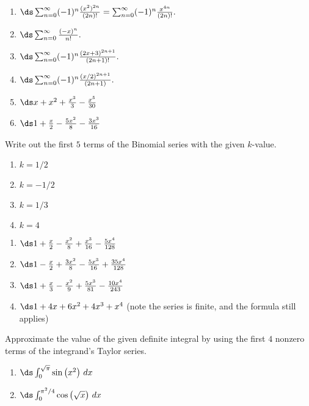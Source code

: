 \begin{enumialphparenastyle}
\begin{ex}
\begin{sol}
\begin{enumerate}
\item 
{$\ds \sum_{n=0}^\infty (-1)^n\frac{(x^2)^{2n}}{(2n)!} = \sum_{n=0}^\infty (-1)^n\frac{x^{4n}}{(2n)!}.$
}
\item 
{$\ds \sum_{n=0}^\infty \frac{(-x)^n}{n!}.$
}
\item 
{$\ds \sum_{n=0}^\infty (-1)^n\frac{(2x+3)^{2n+1}}{(2n+1)!}.$
}
\item 
{$\ds \sum_{n=0}^\infty (-1)^n\frac{(x/2)^{2n+1}}{(2n+1)}.$
}
\item 
{$\ds x+x^2+\frac{x^3}{3}-\frac{x^5}{30}$
}
\item 
{$\ds 1+\frac x2-\frac{5x^2}{8}-\frac{3x^3}{16}$
}
\end{enumerate}
\end{sol}

\end{ex}
\begin{ex}
Write out the first $ 5 $ terms of the Binomial series with the given $k$-value.
\begin{enumerate}
\item {$k=1/2$
}
\item {$k=-1/2$
}
\item {$k=1/3$
}
\item {$k=4$
}
\end{enumerate}

\begin{sol}
\begin{enumerate}
\item 
{$\ds 1+\frac x2-\frac{x^2}{8}+\frac{x^3}{16}-\frac{5x^4}{128}$
}
\item 
{$\ds 1-\frac x2+\frac{3x^2}{8}-\frac{5x^3}{16}+\frac{35x^4}{128}$
}
\item 
{$\ds 1+\frac x3-\frac{x^2}{9}+\frac{5x^3}{81}-\frac{10x^4}{243}$
}
\item 
{$\ds 1+4x+6x^2+4x^3+x^4$ (note the series is finite, and the formula still applies)
}
\end{enumerate}
\end{sol}

\end{ex}


\begin{ex}
Approximate the value of the given definite integral by using the first $ 4 $ nonzero terms of the integrand's Taylor series. 
\begin{enumerate}
\item {$\ds \int_0^{\sqrt{\pi}} \sin \big(x^2\big)\ dx$
}
\item  {$\ds \int_0^{\pi^2/4} \cos \big(\sqrt{x}\big)\ dx$
}
\end{enumerate}


\end{ex}
\end{enumialphparenastyle}
